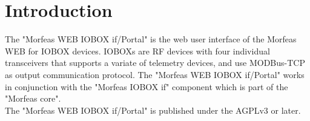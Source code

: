 \section{Introduction}
The "Morfeas WEB IOBOX if/Portal" is the web user interface of the Morfeas WEB for IOBOX devices.
IOBOXs are RF devices with four individual transceivers that supports a variate of telemetry devices, and use MODBus-TCP as output communication protocol.
The "Morfeas WEB IOBOX if/Portal" works in conjunction with the "Morfeas IOBOX if" component which is part of the "Morfeas core".\\

\noindent The "Morfeas WEB IOBOX if/Portal" is published under the AGPLv3 or later.
